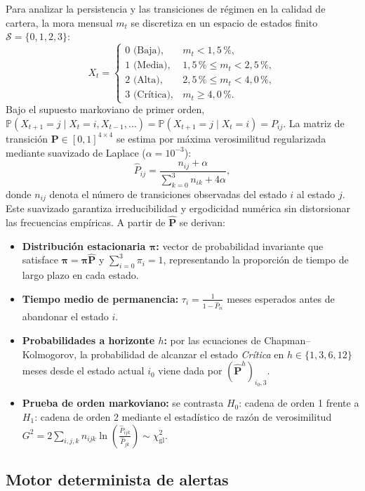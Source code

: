 \documentclass[11pt,letterpaper]{article}
\begin{document}
Para analizar la persistencia y las transiciones de régimen en la calidad de cartera, la mora mensual \(m_t\) se discretiza en un espacio de estados finito \(\mathcal{S} = \{0, 1, 2, 3\}\):
\[
X_t =
\begin{cases}
0 \text{ (Baja)}, & m_t < 1{,}5\,\%, \\
1 \text{ (Media)}, & 1{,}5\,\% \le m_t < 2{,}5\,\%, \\
2 \text{ (Alta)}, & 2{,}5\,\% \le m_t < 4{,}0\,\%, \\
3 \text{ (Crítica)}, & m_t \ge 4{,}0\,\%.
\end{cases}
\]
Bajo el supuesto markoviano de primer orden, \(\mathbb{P}(X_{t+1} = j \mid X_t = i, X_{t-1}, \dots) = \mathbb{P}(X_{t+1} = j \mid X_t = i) = P_{ij}\). La matriz de transición \(\mathbf{P} \in [0,1]^{4\times 4}\) se estima por máxima verosimilitud regularizada mediante suavizado de Laplace (\(\alpha = 10^{-3}\)):
\[
\widehat{P}_{ij} = \frac{n_{ij} + \alpha}{\sum_{k=0}^{3} n_{ik} + 4\alpha},
\]
donde \(n_{ij}\) denota el número de transiciones observadas del estado \(i\) al estado \(j\). Este suavizado garantiza irreducibilidad y ergodicidad numérica sin distorsionar las frecuencias empíricas. A partir de \(\widehat{\mathbf{P}}\) se derivan:
\begin{itemize}[leftmargin=1.5em]
  \item \textbf{Distribución estacionaria \(\boldsymbol{\pi}\):} vector de probabilidad invariante que satisface \(\boldsymbol{\pi} = \boldsymbol{\pi}\widehat{\mathbf{P}}\) y \(\sum_{i=0}^{3}\pi_i = 1\), representando la proporción de tiempo de largo plazo en cada estado.
  \item \textbf{Tiempo medio de permanencia:} \(\tau_i = \frac{1}{1 - \widehat{P}_{ii}}\) meses esperados antes de abandonar el estado \(i\).
  \item \textbf{Probabilidades a horizonte \(h\):} por las ecuaciones de Chapman--Kolmogorov, la probabilidad de alcanzar el estado \emph{Crítica} en \(h \in \{1, 3, 6, 12\}\) meses desde el estado actual \(i_0\) viene dada por \((\widehat{\mathbf{P}}^h)_{i_0, 3}\).
  \item \textbf{Prueba de orden markoviano:} se contrasta \(H_0\): cadena de orden 1 frente a \(H_1\): cadena de orden 2 mediante el estadístico de razón de verosimilitud \(G^2 = 2 \sum_{i,j,k} n_{ijk} \ln\left(\frac{\widehat{P}_{ijk}}{\widehat{P}_{jk}}\right) \sim \chi^2_{\text{gl}}\).
\end{itemize}

\subsection{Motor determinista de alertas}
\end{document}
